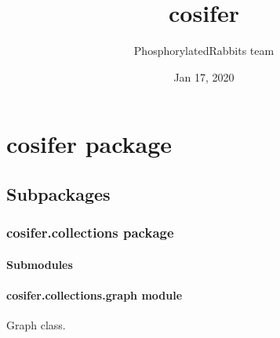 \documentclass[letterpaper,10pt,english]{sphinxmanual}
\title{cosifer}
\date{Jan 17, 2020}
\author{PhosphorylatedRabbits team}
\begin{document}
\pagestyle{empty}
\sphinxmaketitle
\pagestyle{plain}
\sphinxtableofcontents
\pagestyle{normal}
\label{\detokenize{index::doc}}



\chapter{cosifer package}
\label{\detokenize{_modules/cosifer:cosifer-package}}\label{\detokenize{_modules/cosifer::doc}}

\section{Subpackages}
\label{\detokenize{_modules/cosifer:subpackages}}

\subsection{cosifer.collections package}
\label{\detokenize{_modules/cosifer.collections:cosifer-collections-package}}\label{\detokenize{_modules/cosifer.collections::doc}}

\subsubsection{Submodules}
\label{\detokenize{_modules/cosifer.collections:submodules}}

\subsubsection{cosifer.collections.graph module}
\label{\detokenize{_modules/cosifer.collections:module-cosifer.collections.graph}}\label{\detokenize{_modules/cosifer.collections:cosifer-collections-graph-module}}
Graph class.
\end{document}
